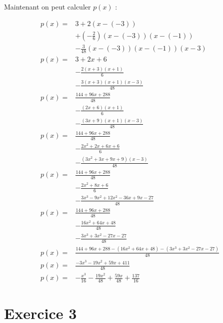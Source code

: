 \documentclass[12pt, letterpaper]{article}
\begin{document}
Maintenant on peut calculer $p(x)$ :

\begin{equation*}
\begin{split}
  p(x) = & 3 + 2(x - (-3)) \\
         & + (-\frac{2}{6})(x - (-3))(x - (-1)) \\
         & -\frac{3}{48}(x - (-3))(x - (-1))(x - 3) \\
  p(x) = & 3 + 2x + 6 \\
         & -\frac{2(x + 3)(x + 1)}{6} \\
         & -\frac{3(x + 3)(x + 1)(x - 3)}{48} \\
  p(x) = & \frac{144 + 96x + 288}{48} \\
         & -\frac{(2x + 6)(x + 1)}{6} \\
         & -\frac{(3x + 9)(x + 1)(x - 3)}{48} \\
  p(x) = & \frac{144 + 96x + 288}{48} \\
         & -\frac{2x^2 + 2x + 6x + 6}{6} \\
         & -\frac{(3x^2 + 3x + 9x + 9)(x - 3)}{48} \\
  p(x) = & \frac{144 + 96x + 288}{48} \\
         & -\frac{2x^2 + 8x + 6}{6} \\
         & -\frac{3x^3 - 9x^2 + 12x^2 - 36x + 9x - 27}{48} \\
  p(x) = & \frac{144 + 96x + 288}{48} \\
         & -\frac{16x^2 + 64x + 48}{48} \\
         & -\frac{3x^3 + 3x^2 - 27x - 27}{48} \\
  p(x) = & \frac{144 + 96x + 288 - (16x^2 + 64x + 48) - (3x^3 + 3x^2 -
    27x - 27)}{48} \\
  p(x) = &  \frac{-3x^3 - 19x^2 + 59x + 411}{48} \\
  p(x) = & -\frac{x^3}{16} - \frac{19 x^2}{48} + \frac{59 x}{48} +
  \frac{137}{16}
\end{split}
\end{equation*}

\section*{Exercice 3}
\end{document}
